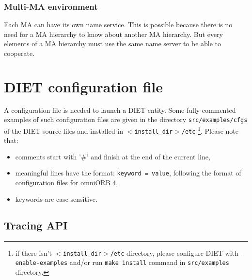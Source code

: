 \subsubsection{Multi-MA environment}

Each MA can have its own name service. This is possible because there is no
need for a MA hierarchy to know about another MA hierarchy. But every elements
of a MA hierarchy must use the same name server to be able to cooperate.



\section{DIET configuration file} 

A configuration file is needed to launch a DIET entity. Some fully
commented examples of such configuration files are given in the
directory \texttt{src/examples/cfgs} of the DIET source files and
installed in \texttt{$<$install\_dir$>$/etc} \footnote{if there isn't 
\texttt{$<$install\_dir$>$/etc} directory, please configure DIET with
\texttt{--enable-examples} and/or run \texttt{make install}
 command in \texttt{src/examples} directory.}. Please note that:
\begin{itemize}
\item comments start with '\#' and finish at the end of the current
  line,
\item meaningful lines have the format: \texttt{keyword = value}, following the
  format of configuration files for omniORB 4,
\item keywords are case sensitive.
\end{itemize}

\subsection{Tracing API}

